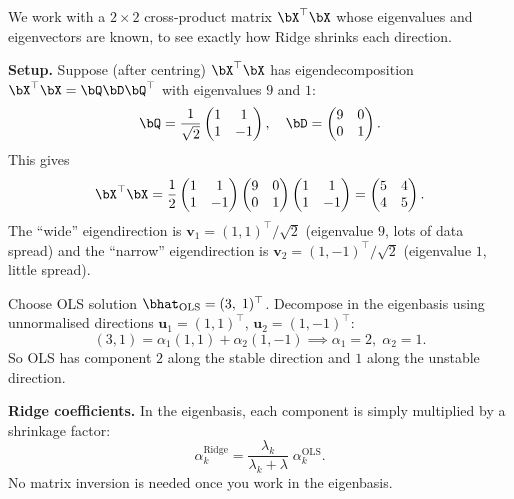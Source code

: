 
\begin{example}\label{ex:ridge}
We work with a $2\times 2$ cross-product matrix $\bX^\top\bX$ whose
eigenvalues and eigenvectors are known, to see exactly how Ridge shrinks
each direction.

\medskip\noindent\textbf{Setup.}
Suppose (after centring) $\bX^\top\bX$ has eigendecomposition
$\bX^\top\bX = \bQ\bD\bQ^\top$ with eigenvalues $9$ and $1$:
\[
\bQ = \frac{1}{\sqrt{2}}\begin{pmatrix}1&1\\1&-1\end{pmatrix},\quad
\bD = \begin{pmatrix}9&0\\0&1\end{pmatrix}.
\]
This gives
\[
\bX^\top\bX
= \frac{1}{2}\begin{pmatrix}1&1\\1&-1\end{pmatrix}
\begin{pmatrix}9&0\\0&1\end{pmatrix}
\begin{pmatrix}1&1\\1&-1\end{pmatrix}
= \begin{pmatrix}5&4\\4&5\end{pmatrix}.
\]
The ``wide'' eigendirection is
$\bm{v}_1 = (1,1)^\top/\sqrt{2}$ (eigenvalue $9$, lots of data spread)
and the ``narrow'' eigendirection is
$\bm{v}_2 = (1,-1)^\top/\sqrt{2}$ (eigenvalue $1$, little spread).

Choose OLS solution $\bhat_{\text{OLS}} = (3,\;1)^\top$.
Decompose in the eigenbasis using unnormalised directions
$\bm{u}_1 = (1,1)^\top$, $\bm{u}_2 = (1,-1)^\top$:
\[
(3,1) = \alpha_1(1,1) + \alpha_2(1,-1)
\implies \alpha_1 = 2,\;\alpha_2 = 1.
\]
So OLS has component $2$ along the stable direction and $1$ along
the unstable direction.

\medskip\noindent\textbf{Ridge coefficients.}
In the eigenbasis, each component is simply multiplied by a shrinkage
factor:
\[
\alpha_k^{\text{Ridge}}
= \frac{\lambda_k}{\lambda_k + \lambda}\;\alpha_k^{\text{OLS}}.
\]
No matrix inversion is needed once you work in the eigenbasis.


\end{example}
